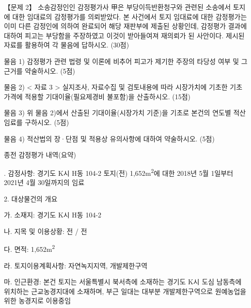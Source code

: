 \begin{longquestion}{【문제 2】}
소송감정인인 감정평가사 甲은 부당이득반환청구와 관련된 소송에서 토지에 대한 임대료의 감정평가를 의뢰받았다. 본 사건에서 토지 임대료에 대한 감정평가는 이미 다른 감정인에 의하여 완료되어 해당 재판부에 제출된 상황인데, 감정평가 결과에 대하여 피고는 부당함을 주장하였고 이것이 받아들여져 재의뢰가 된 사안이다. 제시된 자료를 활용하여 각 물음에 답하시오. (30점) \par
\medskip\noindent 물음 1) 감정평가 관련 법령 및 이론에 비추어 피고가 제기한 주장의 타당성 여부 및 그 근거를 약술하시오. (5점) \par
\medskip\noindent 물음 2) < 자료 3 > 실지조사, 자료수집 및 검토내용에 따라 시장가치에 기초한 기초가격에 적용할 기대이율(필요제경비 불포함)을 산출하시오. (15점) \par
\medskip\noindent 물음 3) 위 물음 2)에서 산출된 기대이율(시장가치 기준)을 기초로 본건의 연도별 적산임료를 구하시오. (5점) \par
\medskip\noindent 물음 4) 적산법의 장·단점 및 적용상 유의사항에 대하여 약술하시오. (5점) \par
\medskip{} 종전 감정평가 내역(요약) \par
\medskip{}. 감정사항: 경기도 K시 H동 104-2 토지(전) 1,652m\textsuperscript{2}에 대한 2018년 5월 1일부터 2021년 4월 30일까지의 임료 \par
2. 대상물건의 개요 \par
\hspace*{1em}가. 소재지: 경기도 K시 H동 104-2 \par
\hspace*{1em}나. 지목 및 이용상황: 전 / 전 \par
\hspace*{1em}다. 면적: 1,652m\textsuperscript{2} \par
\hspace*{1em}라. 토지이용계획사항: 자연녹지지역, 개발제한구역 \par
\hspace*{1em}마. 인근환경: 본건 토지는 서울특별시 북서측에 소재하는 경기도 K시 도심 남동측에 위치하는 근교농경지대에 소재하며, 부근 일대는 대부분 개발제한구역으로 원예농업을 위한 농경지로 이용중임 \par

\end{longquestion}
